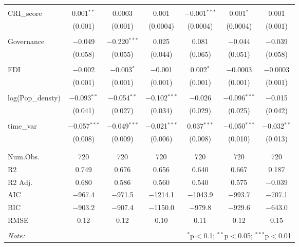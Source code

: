 \begin{table}[!htbp]
\begin{tabular}{@{\extracolsep{-2pt}}lcccccc}
  & & & & & & \\ 
 CRI\_score & 0.001$^{**}$ & 0.0003 & 0.001 & $-$0.001$^{***}$ & 0.001$^{*}$ & 0.001 \\ 
  & (0.001) & (0.001) & (0.0004) & (0.0004) & (0.0004) & (0.001) \\ 
  & & & & & & \\ 
 Governance & $-$0.049 & $-$0.220$^{***}$ & 0.025 & 0.081 & $-$0.044 & $-$0.039 \\ 
  & (0.058) & (0.055) & (0.044) & (0.065) & (0.051) & (0.058) \\ 
  & & & & & & \\ 
 FDI & $-$0.002 & $-$0.003$^{*}$ & $-$0.001 & 0.002$^{*}$ & $-$0.0003 & $-$0.0003 \\ 
  & (0.001) & (0.001) & (0.001) & (0.001) & (0.001) & (0.001) \\ 
  & & & & & & \\ 
 log(Pop\_densty) & $-$0.093$^{**}$ & $-$0.054$^{**}$ & $-$0.102$^{***}$ & $-$0.026 & $-$0.096$^{***}$ & $-$0.015 \\ 
  & (0.041) & (0.027) & (0.034) & (0.029) & (0.025) & (0.042) \\ 
  & & & & & & \\ 
 time\_var & $-$0.057$^{***}$ & $-$0.049$^{***}$ & $-$0.021$^{***}$ & 0.037$^{***}$ & $-$0.050$^{***}$ & $-$0.032$^{**}$ \\ 
  & (0.008) & (0.009) & (0.006) & (0.008) & (0.010) & (0.013) \\ 
  & & & & & & \\ 
 \hline \\[-1.8ex] 
Num.Obs. & \num{720} & \num{720} & \num{720} & \num{720} & \num{720} & \num{720}\\
R2 & \num{0.749} & \num{0.676} & \num{0.656} & \num{0.640} & \num{0.667} & \num{0.187}\\
R2 Adj. & \num{0.680} & \num{0.586} & \num{0.560} & \num{0.540} & \num{0.575} & \num{-0.039}\\
AIC & \num{-967.4} & \num{-971.5} & \num{-1214.1} & \num{-1043.9} & \num{-993.7} & \num{-707.1}\\
BIC & \num{-903.2} & \num{-907.4} & \num{-1150.0} & \num{-979.8} & \num{-929.6} & \num{-643.0}\\
RMSE & \num{0.12} & \num{0.12} & \num{0.10} & \num{0.11} & \num{0.12} & \num{0.15}\\
\bottomrule
\hline \\[-1.8ex] 
\textit{Note:}  & \multicolumn{6}{r}{$^{*}$p$<$0.1; $^{**}$p$<$0.05; $^{***}$p$<$0.01} \\ 
\end{tabular} 
\end{table} 